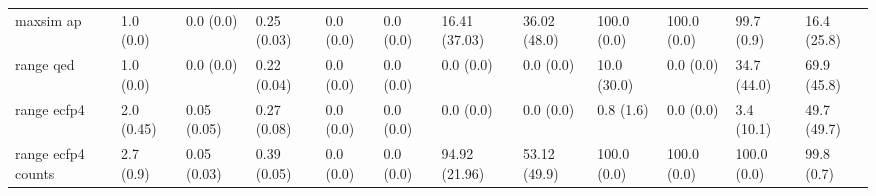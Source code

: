 \begin{tabular}{llllllllllll}
maxsim ap & {\cellcolor[HTML]{F6FCFD}} \color[HTML]{000000} 1.0 (0.0) & {\cellcolor[HTML]{F7FCFD}} \color[HTML]{000000} 0.0 (0.0) & {\cellcolor[HTML]{5CBD98}} \color[HTML]{F1F1F1} 0.25 (0.03) & {\cellcolor[HTML]{F7FCFD}} \color[HTML]{000000} 0.0 (0.0) & {\cellcolor[HTML]{F7FCFD}} \color[HTML]{000000} 0.0 (0.0) & {\cellcolor[HTML]{DDF2F3}} \color[HTML]{000000} 16.41 (37.03) & {\cellcolor[HTML]{9FDACC}} \color[HTML]{000000} 36.02 (48.0) & {\cellcolor[HTML]{DBF1F1}} \color[HTML]{000000} 100.0 (0.0) & {\cellcolor[HTML]{F7FCFD}} \color[HTML]{000000} 100.0 (0.0) & {\cellcolor[HTML]{3CA86D}} \color[HTML]{F1F1F1} 99.7 (0.9) & {\cellcolor[HTML]{D1EEEA}} \color[HTML]{000000} 16.4 (25.8) \\
range qed & {\cellcolor[HTML]{F6FCFD}} \color[HTML]{000000} 1.0 (0.0) & {\cellcolor[HTML]{F7FCFD}} \color[HTML]{000000} 0.0 (0.0) & {\cellcolor[HTML]{80CDB7}} \color[HTML]{000000} 0.22 (0.04) & {\cellcolor[HTML]{F7FCFD}} \color[HTML]{000000} 0.0 (0.0) & {\cellcolor[HTML]{F7FCFD}} \color[HTML]{000000} 0.0 (0.0) & {\cellcolor[HTML]{F7FCFD}} \color[HTML]{000000} 0.0 (0.0) & {\cellcolor[HTML]{F7FCFD}} \color[HTML]{000000} 0.0 (0.0) & {\cellcolor[HTML]{F7FCFD}} \color[HTML]{000000} 10.0 (30.0) & {\cellcolor[HTML]{F7FCFD}} \color[HTML]{000000} 0.0 (0.0) & {\cellcolor[HTML]{38A367}} \color[HTML]{F1F1F1} 34.7 (44.0) & {\cellcolor[HTML]{67C2A5}} \color[HTML]{000000} 69.9 (45.8) \\
range ecfp4 & {\cellcolor[HTML]{F4FBFC}} \color[HTML]{000000} 2.0 (0.45) & {\cellcolor[HTML]{F7FCFD}} \color[HTML]{000000} 0.05 (0.05) & {\cellcolor[HTML]{7DCCB5}} \color[HTML]{000000} 0.27 (0.08) & {\cellcolor[HTML]{F7FCFD}} \color[HTML]{000000} 0.0 (0.0) & {\cellcolor[HTML]{F7FCFD}} \color[HTML]{000000} 0.0 (0.0) & {\cellcolor[HTML]{F7FCFD}} \color[HTML]{000000} 0.0 (0.0) & {\cellcolor[HTML]{F7FCFD}} \color[HTML]{000000} 0.0 (0.0) & {\cellcolor[HTML]{C0E7DF}} \color[HTML]{000000} 0.8 (1.6) & {\cellcolor[HTML]{F5FBFC}} \color[HTML]{000000} 0.0 (0.0) & {\cellcolor[HTML]{00441B}} \color[HTML]{F1F1F1} 3.4 (10.1) & {\cellcolor[HTML]{00441B}} \color[HTML]{F1F1F1} 49.7 (49.7) \\
range ecfp4 counts & {\cellcolor[HTML]{F4FBFC}} \color[HTML]{000000} 2.7 (0.9) & {\cellcolor[HTML]{F7FCFD}} \color[HTML]{000000} 0.05 (0.03) & {\cellcolor[HTML]{7FCDB6}} \color[HTML]{000000} 0.39 (0.05) & {\cellcolor[HTML]{F7FCFD}} \color[HTML]{000000} 0.0 (0.0) & {\cellcolor[HTML]{F7FCFD}} \color[HTML]{000000} 0.0 (0.0) & {\cellcolor[HTML]{005321}} \color[HTML]{F1F1F1} 94.92 (21.96) & {\cellcolor[HTML]{5CBD98}} \color[HTML]{F1F1F1} 53.12 (49.9) & {\cellcolor[HTML]{2B9452}} \color[HTML]{F1F1F1} 100.0 (0.0) & {\cellcolor[HTML]{D8F0EF}} \color[HTML]{000000} 100.0 (0.0) & {\cellcolor[HTML]{00441B}} \color[HTML]{F1F1F1} 100.0 (0.0) & {\cellcolor[HTML]{00441B}} \color[HTML]{F1F1F1} 99.8 (0.7) \\

\end{tabular}
